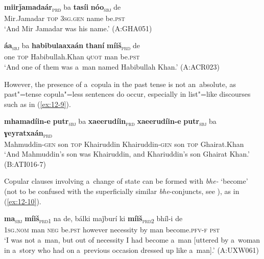 \begin{exe}
\ex
\label{ex:12-7}
\gll {\ob}\textbf{miirǰamadaár}{\cb}\textsubscript{\textsc{\upshape prd}} ba {\ob}\textbf{tasíi} \textbf{nóo}{\cb}\textsubscript{\textsc{\upshape sbj}} de\\
Mir.Jamadar \textsc{top} \textsc{3sg.gen} name be.\textsc{pst}\\
\glt `And Mir Jamadar was his name.' (A:GHA051)
\end{exe}
\begin{exe}
\ex
\label{ex:12-8}
\gll {\ob}\textbf{áa}{\cb}\textsubscript{\textsc{\upshape sbj}} ba {\ob}\textbf{habibulaaxaán} \textbf{thaní} \textbf{míiš}{\cb}\textsubscript{\textsc{\upshape prd}} de\\
one \textsc{top} Habibullah.Khan \textsc{quot} man be.\textsc{pst}\\
\glt `And one of them was a~man named Habibullah Khan.' (A:ACR023)
\end{exe}

However, the presence of a~copula in the past tense is not an~absolute, as past"=tense copula"=less sentences do occur, especially in list"=like discourses such as in (\ref{ex:12-9}).

\begin{exe}
\ex
\label{ex:12-9}
\gll {\ob}\textbf{mhamadíin-e} \textbf{putr}{\cb}\textsubscript{\textsc{\upshape sbj}} ba {\ob}\textbf{xaeerudíin}{\cb}\textsubscript{\textsc{\upshape prd}} {\ob}\textbf{xaeerudíin-e} \textbf{putr}{\cb}\textsubscript{\textsc{\upshape sbj}} ba {\ob}\textbf{ɣeyratxaán}{\cb}\textsubscript{\textsc{\upshape prd}} \\
Mahmuddin-\textsc{gen} son \textsc{top} Khairuddin Khairuddin-\textsc{gen} son \textsc{top} Ghairat.Khan \\
\glt `And Mahmuddin's son was Khairuddin, and Khariuddin's son Ghairat Khan.' (B:ATI016-7)
\end{exe}

Copular clauses involving a~change of state can be formed with \textit{bhe-} `become' (not to be confused with the superficially similar \textit{bhe}-conjuncts, see ), as in (\ref{ex:12-10}).

\begin{exe}
\ex
\label{ex:12-10}
\gll {\ob}\textbf{ma}{\cb}\textsubscript{\textsc{\upshape sbj}} {\ob}\textbf{míiš}{\cb}\textsubscript{\textsc{\upshape prd1}} na de, bálki maǰburí ki {\ob}\textbf{míiš}{\cb}\textsubscript{\textsc{\upshape prd2}} bhíl-i de \\
\textsc{1sg.nom} man \textsc{neg} be.\textsc{pst}  however necessity by man become.\textsc{pfv-f} \textsc{pst} \\
\glt `I was not a~man, but out of necessity I had become a~man [uttered by a~woman in a~story who had on a~previous occasion dressed up like a~man].' (A:UXW061)
\end{exe}

